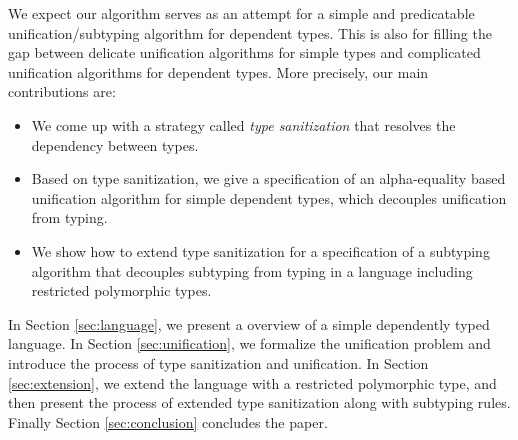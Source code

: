 We expect our algorithm serves as an attempt
for a simple and predicatable unification/subtyping algorithm for dependent
types. This is also for
filling the gap between
delicate unification algorithms for simple types
and
complicated unification algorithms for dependent types.
More precisely, our main contributions are:

\begin{itemize}
  \item We come up with a strategy called \textit{type sanitization}
    that resolves the
    dependency between types.
  \item Based on type sanitization, we give a specification of an alpha-equality
    based unification algorithm
    for simple dependent types, which
    decouples unification from typing.
  \item We show how to extend type sanitization for a specification of a
    subtyping algorithm
    that decouples
    subtyping from typing in a language including restricted polymorphic types.
\end{itemize}

In Section \ref{sec:language}, we present a overview of a simple dependently
typed language.
In Section \ref{sec:unification}, we formalize the unification
problem and introduce the process of type sanitization and unification. In
Section \ref{sec:extension}, we extend the language with a restricted
polymorphic type, and then present the process of extended type sanitization
along with subtyping rules. Finally Section \ref{sec:conclusion} concludes the
paper.